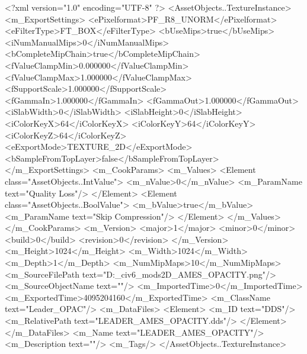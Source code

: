<?xml version="1.0" encoding="UTF-8" ?>
<AssetObjects..TextureInstance>
	<m_ExportSettings>
		<ePixelformat>PF_R8_UNORM</ePixelformat>
		<eFilterType>FT_BOX</eFilterType>
		<bUseMips>true</bUseMips>
		<iNumManualMips>0</iNumManualMips>
		<bCompleteMipChain>true</bCompleteMipChain>
		<fValueClampMin>0.000000</fValueClampMin>
		<fValueClampMax>1.000000</fValueClampMax>
		<fSupportScale>1.000000</fSupportScale>
		<fGammaIn>1.000000</fGammaIn>
		<fGammaOut>1.000000</fGammaOut>
		<iSlabWidth>0</iSlabWidth>
		<iSlabHeight>0</iSlabHeight>
		<iColorKeyX>64</iColorKeyX>
		<iColorKeyY>64</iColorKeyY>
		<iColorKeyZ>64</iColorKeyZ>
		<eExportMode>TEXTURE_2D</eExportMode>
		<bSampleFromTopLayer>false</bSampleFromTopLayer>
	</m_ExportSettings>
	<m_CookParams>
		<m_Values>
			<Element class="AssetObjects..IntValue">
				<m_nValue>0</m_nValue>
				<m_ParamName text="Quality Loss"/>
			</Element>
			<Element class="AssetObjects..BoolValue">
				<m_bValue>true</m_bValue>
				<m_ParamName text="Skip Compression"/>
			</Element>
		</m_Values>
	</m_CookParams>
	<m_Version>
		<major>1</major>
		<minor>0</minor>
		<build>0</build>
		<revision>0</revision>
	</m_Version>
	<m_Height>1024</m_Height>
	<m_Width>1024</m_Width>
	<m_Depth>1</m_Depth>
	<m_NumMipMaps>10</m_NumMipMaps>
	<m_SourceFilePath text="D:\Documents\GitHub\Uzuki_civ6_mods\LandsolPrinFes\Texture2D\LEADER_AMES_OPACITY.png"/>
	<m_SourceObjectName text=""/>
	<m_ImportedTime>0</m_ImportedTime>
	<m_ExportedTime>4095204160</m_ExportedTime>
	<m_ClassName text="Leader_OPAC"/>
	<m_DataFiles>
		<Element>
			<m_ID text="DDS"/>
			<m_RelativePath text="LEADER_AMES_OPACITY.dds"/>
		</Element>
	</m_DataFiles>
	<m_Name text="LEADER_AMES_OPACITY"/>
	<m_Description text=""/>
	<m_Tags/>
</AssetObjects..TextureInstance>

